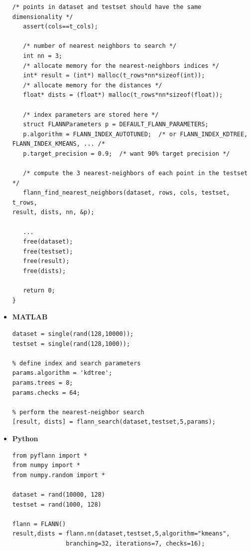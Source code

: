 \documentclass[letter,10pt]{article}
\begin{document}
\begin{itemize}
\begin{Verbatim}[fontsize=\scriptsize,frame=single]
   /* points in dataset and testset should have the same dimensionality */
   assert(cols==t_cols);

   /* number of nearest neighbors to search */
   int nn = 3;
   /* allocate memory for the nearest-neighbors indices */
   int* result = (int*) malloc(t_rows*nn*sizeof(int));                                                               
   /* allocate memory for the distances */
   float* dists = (float*) malloc(t_rows*nn*sizeof(float));

   /* index parameters are stored here */
   struct FLANNParameters p = DEFAULT_FLANN_PARAMETERS;
   p.algorithm = FLANN_INDEX_AUTOTUNED;  /* or FLANN_INDEX_KDTREE, FLANN_INDEX_KMEANS, ... /*
   p.target_precision = 0.9;  /* want 90% target precision */

   /* compute the 3 nearest-neighbors of each point in the testset */
   flann_find_nearest_neighbors(dataset, rows, cols, testset, t_rows,
result, dists, nn, &p);

   ...
   free(dataset);
   free(testset);
   free(result);
   free(dists);

   return 0;
}

\end{Verbatim}



\item \textbf{MATLAB}
\begin{Verbatim}[fontsize=\scriptsize,frame=single]
% create random dataset and test set
dataset = single(rand(128,10000));
testset = single(rand(128,1000));

% define index and search parameters
params.algorithm = 'kdtree';
params.trees = 8;
params.checks = 64;

% perform the nearest-neighbor search
[result, dists] = flann_search(dataset,testset,5,params);
\end{Verbatim}

\item \textbf{Python}
\begin{Verbatim}[fontsize=\scriptsize,frame=single]
from pyflann import *
from numpy import *
from numpy.random import *

dataset = rand(10000, 128)
testset = rand(1000, 128)

flann = FLANN()
result,dists = flann.nn(dataset,testset,5,algorithm="kmeans",
               branching=32, iterations=7, checks=16);
\end{Verbatim}

\end{itemize}
\end{document}
